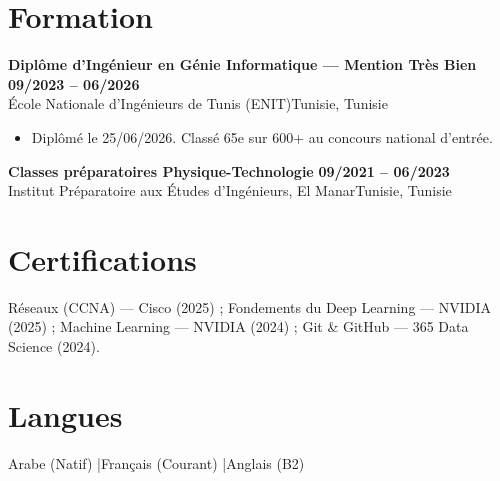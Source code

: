 \documentclass[a4paper,9pt]{article}
\newcommand{\cventry}[4]{\textbf{#1} \hfill \textbf{#4}\\[0.2pt]#2{\ifx\relax#3\relax\else, #3\fi}\par\vspace{0.3pt}}
\begin{document}
\section{Formation}
\cventry{Diplôme d'Ingénieur en Génie Informatique --- Mention Très Bien}{École Nationale d'Ingénieurs de Tunis (ENIT)}{Tunisie}{09/2023 -- 06/2026}
\begin{itemize}
  \item Diplômé le 25/06/2026. Classé 65e sur 600+ au concours national d'entrée.
\end{itemize}
\cventry{Classes préparatoires Physique-Technologie}{Institut Préparatoire aux Études d'Ingénieurs, El Manar}{Tunisie}{09/2021 -- 06/2023}
\section{Certifications}
Réseaux (CCNA) --- Cisco (2025) ; Fondements du Deep Learning --- NVIDIA (2025) ; Machine Learning --- NVIDIA (2024) ; Git \& GitHub --- 365 Data Science (2024).
\section{Langues}
Arabe (Natif) \quad|\quad Français (Courant) \quad|\quad Anglais (B2)
\end{document}
